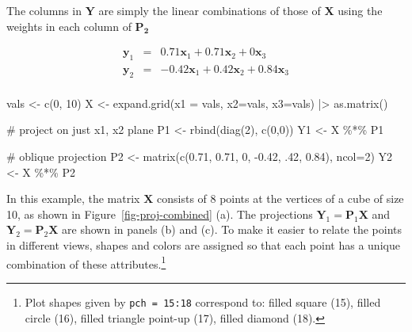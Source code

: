 \documentclass[
  letterpaper,
  10pt,
  krantz2]{krantz}
\makeatletter
\newenvironment{Shaded}{\begin{snugshade}}{\end{snugshade}}
\newcommand{\AttributeTok}[1]{\textcolor[rgb]{0.40,0.45,0.13}{#1}}
\newcommand{\CommentTok}[1]{\textcolor[rgb]{0.37,0.37,0.37}{#1}}
\newcommand{\DecValTok}[1]{\textcolor[rgb]{0.68,0.00,0.00}{#1}}
\newcommand{\FloatTok}[1]{\textcolor[rgb]{0.68,0.00,0.00}{#1}}
\newcommand{\FunctionTok}[1]{\textcolor[rgb]{0.28,0.35,0.67}{#1}}
\newcommand{\NormalTok}[1]{\textcolor[rgb]{0.00,0.23,0.31}{#1}}
\newcommand{\OtherTok}[1]{\textcolor[rgb]{0.00,0.23,0.31}{#1}}
\newcommand{\SpecialCharTok}[1]{\textcolor[rgb]{0.37,0.37,0.37}{#1}}
\newenvironment{kframe}{%
  \medskip{}
  \setlength{\fboxsep}{.8em}
  \def\at@end@of@kframe{}%
  \ifinner\ifhmode%
  \def\at@end@of@kframe{\end{minipage}}%
  \begin{minipage}{\columnwidth}%
  \fi\fi%
  \def\FrameCommand##1{\hskip\@totalleftmargin \hskip-\fboxsep
  \colorbox{shadecolor}{##1}\hskip-\fboxsep
      \hskip-\linewidth \hskip-\@totalleftmargin \hskip\columnwidth}%
  \MakeFramed {\advance\hsize-\width
    \@totalleftmargin\z@ \linewidth\hsize
    \@setminipage}}%
{\par\unskip\endMakeFramed%
  \at@end@of@kframe}
\renewenvironment{Shaded}{\begin{kframe}}{\end{kframe}}
\makeatother
\begin{document}
The columns in \(\mathbf{Y}\) are simply the linear combinations of
those of \(\mathbf{X}\) using the weights in each column of
\(\mathbf{P_2}\)

\begin{eqnarray*}
\mathbf{y}_1 & = & 0.71 \mathbf{x}_1 + 0.71 \mathbf{x}_2 + 0 \mathbf{x}_3\\
\mathbf{y}_2 & = & -0.42 \mathbf{x}_1 + 0.42 \mathbf{x}_2 + 0.84 \mathbf{x}_3 \\
\end{eqnarray*}

\begin{Shaded}
\begin{Highlighting}[]
\NormalTok{vals }\OtherTok{\textless{}{-}} \FunctionTok{c}\NormalTok{(}\DecValTok{0}\NormalTok{, }\DecValTok{10}\NormalTok{)}
\NormalTok{X }\OtherTok{\textless{}{-}} \FunctionTok{expand.grid}\NormalTok{(}\AttributeTok{x1 =}\NormalTok{ vals, }\AttributeTok{x2=}\NormalTok{vals, }\AttributeTok{x3=}\NormalTok{vals) }\SpecialCharTok{|\textgreater{}} \FunctionTok{as.matrix}\NormalTok{()}

\CommentTok{\# project on just x1, x2 plane}
\NormalTok{P1 }\OtherTok{\textless{}{-}} \FunctionTok{rbind}\NormalTok{(}\FunctionTok{diag}\NormalTok{(}\DecValTok{2}\NormalTok{), }\FunctionTok{c}\NormalTok{(}\DecValTok{0}\NormalTok{,}\DecValTok{0}\NormalTok{))}
\NormalTok{Y1 }\OtherTok{\textless{}{-}}\NormalTok{ X }\SpecialCharTok{\%*\%}\NormalTok{ P1}

\CommentTok{\# oblique projection}
\NormalTok{P2 }\OtherTok{\textless{}{-}} \FunctionTok{matrix}\NormalTok{(}\FunctionTok{c}\NormalTok{(}\FloatTok{0.71}\NormalTok{, }\FloatTok{0.71}\NormalTok{, }\DecValTok{0}\NormalTok{, }\SpecialCharTok{{-}}\FloatTok{0.42}\NormalTok{, .}\DecValTok{42}\NormalTok{, }\FloatTok{0.84}\NormalTok{), }\AttributeTok{ncol=}\DecValTok{2}\NormalTok{)}
\NormalTok{Y2 }\OtherTok{\textless{}{-}}\NormalTok{ X }\SpecialCharTok{\%*\%}\NormalTok{ P2}
\end{Highlighting}
\end{Shaded}

In this example, the matrix \(\mathbf{X}\) consists of 8 points at the
vertices of a cube of size 10, as shown in
Figure~\ref{fig-proj-combined} (a). The projections
\(\mathbf{Y}_1 = \mathbf{P}_1 \mathbf{X}\) and
\(\mathbf{Y}_2 = \mathbf{P}_2 \mathbf{X}\) are shown in panels (b) and
(c). To make it easier to relate the points in different views, shapes
and colors are assigned so that each point has a unique combination of
these attributes.\footnote{Plot shapes given by \texttt{pch\ =\ 15:18}
  correspond to: filled square (15), filled circle (16), filled triangle
  point-up (17), filled diamond (18).}
\end{document}
